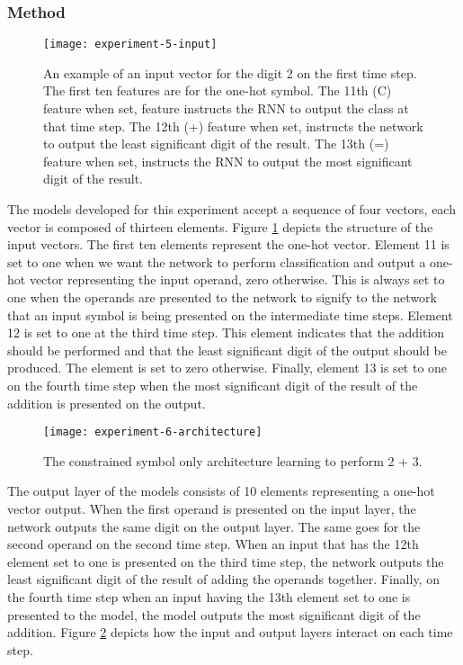 \subsubsection{Method}

\begin{figure}
	\centering
	\texttt{[image: experiment-5-input]}
	\caption{An example of an input vector for the digit 2 on the first time step. The first ten features are for the one-hot symbol. The 11th (C) feature when set, feature instructs the RNN to output the class at that time step. The 12th (+) feature when set, instructs the network to output the least significant digit of the result. The 13th (=) feature when set, instructs the RNN to output the most significant digit of the result.}
	\label{fig:experiment-5-input}
\end{figure}

The models developed for this experiment accept a sequence of four vectors, each vector is composed of thirteen elements. Figure \ref{fig:experiment-5-input} depicts the structure of the input vectors. The first ten elements represent the one-hot vector. Element 11 is set to one when we want the network to perform classification and output a one-hot vector representing the input operand, zero otherwise. This is always set to one when the operands are presented to the network to signify to the network that an input symbol is being presented on the intermediate time steps. Element 12 is set to one at the third time step. This element indicates that the addition should be performed and that the least significant digit of the output should be produced. The element is set to zero otherwise. Finally, element 13 is set to one on the fourth time step when the most significant digit of the result of the addition is presented on the output.

\begin{figure}
	\centering
	\texttt{[image: experiment-6-architecture]}
	\caption{The constrained symbol only architecture learning to perform 2 + 3.}
	\label{fig:experiment-6-architecture}
\end{figure}

The output layer of the models consists of 10 elements representing a one-hot vector output. When the first operand is presented on the input layer, the network outputs the same digit on the output layer. The same goes for the second operand on the second time step. When an input that has the 12th element set to one is presented on the third time step, the network outputs the least significant digit of the result of adding the operands together. Finally, on the fourth time step when an input having the 13th element set to one is presented to the model, the model outputs the most significant digit of the addition. Figure \ref{fig:experiment-6-architecture} depicts how the input and output layers interact on each time step.

